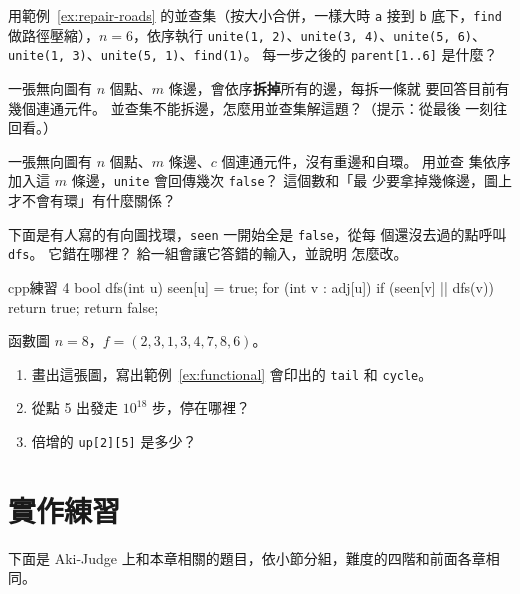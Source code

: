 \begin{drills}[label=drills:ch19]
\item 用範例~\ref{ex:repair-roads} 的並查集（按大小合併，一樣大時 \texttt{a} 接到
\texttt{b} 底下，\texttt{find} 做路徑壓縮），$n = 6$，依序執行
\texttt{unite(1, 2)}、\texttt{unite(3, 4)}、\texttt{unite(5, 6)}、
\texttt{unite(1, 3)}、\texttt{unite(5, 1)}、\texttt{find(1)}。 每一步之後的
\texttt{parent[1..6]} 是什麼？

\item 一張無向圖有 $n$ 個點、$m$ 條邊，會依序\textbf{拆掉}所有的邊，每拆一條就
要回答目前有幾個連通元件。 並查集不能拆邊，怎麼用並查集解這題？（提示：從最後
一刻往回看。）

\item 一張無向圖有 $n$ 個點、$m$ 條邊、$c$ 個連通元件，沒有重邊和自環。 用並查
集依序加入這 $m$ 條邊，\texttt{unite} 會回傳幾次 \texttt{false}？ 這個數和「最
少要拿掉幾條邊，圖上才不會有環」有什麼關係？

\item 下面是有人寫的有向圖找環，\texttt{seen} 一開始全是 \texttt{false}，從每
個還沒去過的點呼叫 \texttt{dfs}。 它錯在哪裡？ 給一組會讓它答錯的輸入，並說明
怎麼改。
\begin{code}{cpp}{練習 4}
bool dfs(int u) {
    seen[u] = true;
    for (int v : adj[u]) {
        if (seen[v] || dfs(v)) {
            return true;
        }
    }
    return false;
}
\end{code}

\item 函數圖 $n = 8$，$f = (2, 3, 1, 3, 4, 7, 8, 6)$。
\begin{enumerate}
\item 畫出這張圖，寫出範例~\ref{ex:functional} 會印出的 \texttt{tail} 和
\texttt{cycle}。
\item 從點 5 出發走 $10^{18}$ 步，停在哪裡？
\item 倍增的 \texttt{up[2][5]} 是多少？
\end{enumerate}
\end{drills}

\section{實作練習}
\label{sec:ch19-practice}

下面是 Aki-Judge 上和本章相關的題目，依小節分組，難度的四階和前面各章相同。

